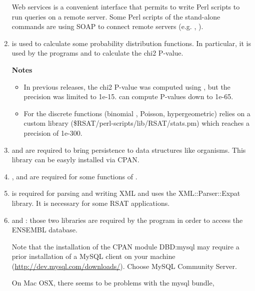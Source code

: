 \documentclass[12pt,a4paper, oneside]{scrreprt} %
\begin{document}
\begin{enumerate}
  \RSAT Web services is a convenient interface that permits to write
  Perl scripts to run \RSAT queries on a remote server. Some Perl
  scripts of the \RSAT stand-alone commands are using SOAP to connect
  remote servers (e.g. ,
  ).

\item {} is used to calculate some
  probability distribution functions. In particular, it is used by the
  programs  and  to
  calculate the chi2 P-value.

  \textbf{Notes} 
  \begin{itemize}
  \item In previous releases, the chi2 P-value was computed using
    , but the precision was limited to
    1e-15.  can compute P-values
    down to 1e-65.
  \item For the discrete functions (binomial , Poisson,
    hypergeometric) \RSAT relies on a custom library
    (\$RSAT/perl-scripts/lib/RSAT/stats.pm) which reaches a precision
    of 1e-300.
  \end{itemize}


\item {} and  are required
  to bring persistence to data structures like organisms. This library
  can be easyly installed via CPAN.

\item {},  and 
  are required for some functions of .

\item {} is required for parsing and writing XML and uses
  the XML::Parser::Expat library. It is necessary for some RSAT
  applications.

\item {}  and : those two libraries are
  required by the program  in order to
  access the ENSEMBL database.
  
  Note that the
installation of the CPAN module DBD:mysql may require a prior
installation of a MySQL client on your machine
(\url{http://dev.mysql.com/downloads/}). Choose MySQL Community Server.

On Mac OSX, there seems to be problems with the mysql bundle,


\end{enumerate}
\end{document}
